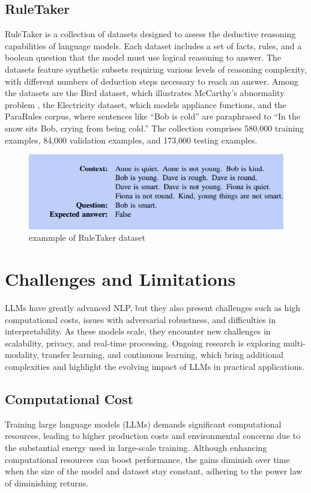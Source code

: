 \subsection{RuleTaker}
RuleTaker is a collection of datasets designed to assess the deductive reasoning capabilities of language models. Each dataset includes a set of facts, rules, and a boolean question that the model must use logical reasoning to answer. The datasets feature synthetic subsets requiring various levels of reasoning complexity, with different numbers of deduction steps necessary to reach an answer. Among the datasets are the Bird dataset, which illustrates McCarthy’s abnormality problem , the Electricity dataset, which models appliance functions, and the ParaRules corpus, where sentences like “Bob is cold” are paraphrased to “In the snow sits Bob, crying from being cold.” The collection comprises 580,000 training examples, 84,000 validation examples, and 173,000 testing examples\cite{helwe2024}.
\begin{figure}
	\centering
	\includegraphics[width=0.7\linewidth]{Figures/dataset-exmple.png}
	\caption{exammple of RuleTaker dataset }
\end{figure}
\section{Challenges and Limitations}
LLMs have greatly advanced NLP, but they also present challenges such as high computational costs, issues with adversarial robustness, and difficulties in interpretability. As these models scale, they encounter new challenges in scalability, privacy, and real-time processing. Ongoing research is exploring multi-modality, transfer learning, and continuous learning, which bring additional complexities and highlight the evolving impact of LLMs in practical applications\cite{Naveed2024}.
\subsection{ Computational Cost}
Training large language models (LLMs) demands significant computational resources, leading to higher production costs and environmental concerns due to the substantial energy used in large-scale training. Although enhancing computational resources can boost performance, the gains diminish over time when the size of the model and dataset stay constant, adhering to the power law of diminishing returns.
